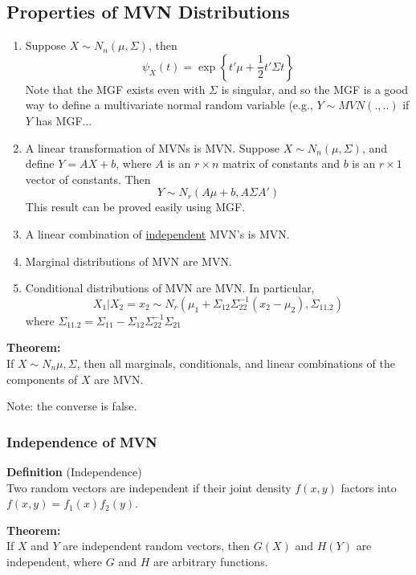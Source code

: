 \documentclass[12pt]{article}
\numberwithin{equation}{section}
\begin{document}
\subsection{Properties of MVN Distributions}
\begin{enumerate}
  \item Suppose $X \sim N_n(\mu, \Sigma)$, then
  \begin{equation*}
    \psi_X(t) = \exp \left\{ t'\mu + \frac{1}{2} t'\Sigma t \right\}
  \end{equation*}
  Note that the MGF exists even with $\Sigma$ is singular, and so the MGF is a good way to define a multivariate normal random variable (e.g., $Y \sim MVN(., ..)$ if $Y$ has MGF...
  \item A linear transformation of MVNs is MVN. Suppose 
  $X \sim N_n(\mu, \Sigma)$, and define $Y = AX + b$, where $A$ is an $r \times n$ matrix of constants and $b$ is an $r \times 1$ vector of constants. Then
  \begin{equation*}
    Y \sim N_r(A\mu + b, A \Sigma A')
  \end{equation*}
  This result can be proved easily using MGF.
  \item A linear combination of \underline{independent} MVN's is MVN.
  \item Marginal distributions of MVN are MVN.
  \item Conditional distributions of MVN are MVN. In particular,
  \begin{equation*}
    X_1 | X_2 = x_2 \sim N_r(\mu_1 + \Sigma_{12} \Sigma_{22}^{-1} (x_2 - \mu_2), \Sigma_{11.2})
  \end{equation*}
  where $\Sigma_{11.2} = \Sigma_11 - \Sigma_{12} \Sigma_{22}^{-1} \Sigma_{21}$
\end{enumerate}

\textbf{Theorem:} \\
If $X \sim N_n{\mu, \Sigma}$, then all marginals, conditionals, and linear combinations of the components of $X$ are MVN.

Note: the converse is false.

\subsubsection{Independence of MVN}
\textbf{Definition} (Independence) \\
Two random vectors are independent if their joint density $f(x,y)$ factors into $f(x, y) = f_1(x) f_2(y)$.

\textbf{Theorem:} \\
If $X$ and $Y$ are independent random vectors, then $G(X)$ and $H(Y)$ are independent, where $G$ and $H$ are arbitrary functions.
\end{document}
